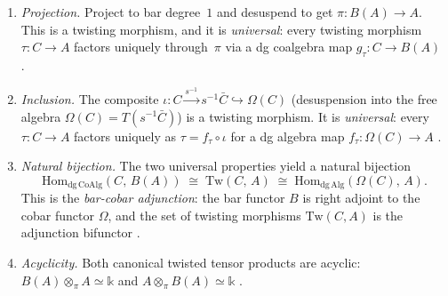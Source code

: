 \begin{proposition}\label{prop:universal-twisting-adjunction}
\begin{enumerate}[label=\textup{(\roman*)}]
\item \emph{Projection.}
 Project to bar degree~$1$ and desuspend to get
 $\pi\colon B(A) \to A$.
 This is a twisting morphism, and it is \emph{universal}:
 every twisting morphism $\tau\colon C \to A$ factors
 uniquely through~$\pi$ via a dg coalgebra map
 $g_\tau\colon C \to B(A)$
 \cite[Theorem~2.2.4]{LV12}.

\item \emph{Inclusion.}
 The composite
 $\iota\colon C \xrightarrow{s^{-1}} s^{-1}\bar{C}
 \hookrightarrow \Omega(C)$
 (desuspension into the free algebra $\Omega(C) = T(s^{-1}\bar{C})$)
 is a twisting morphism. It is \emph{universal}:
 every $\tau\colon C \to A$ factors uniquely as
 $\tau = f_\tau \circ \iota$ for a dg algebra map
 $f_\tau\colon \Omega(C) \to A$
 \cite[Theorem~2.2.7]{LV12}.

\item \emph{Natural bijection.}
 The two universal properties yield a natural bijection
 \begin{equation}\label{eq:tw-adjunction}
 \mathrm{Hom}_{\mathrm{dg\,CoAlg}}(C,\, B(A))
 \;\cong\;
 \mathrm{Tw}(C,\, A)
 \;\cong\;
 \mathrm{Hom}_{\mathrm{dg\,Alg}}(\Omega(C),\, A).
 \end{equation}
 This is the \emph{bar-cobar adjunction}: the bar functor $B$ is
 right adjoint to the cobar functor $\Omega$, and the set of
 twisting morphisms $\mathrm{Tw}(C, A)$ is the adjunction
 bifunctor \cite[Theorem~2.2.9]{LV12}.

\item \emph{Acyclicity.}
 Both canonical twisted tensor products are acyclic:
 $B(A) \otimes_\pi A \simeq \mathbb{k}$
 and $A \otimes_\pi B(A) \simeq \mathbb{k}$
 \cite[Corollary~2.2.5]{LV12}.
\end{enumerate}
\end{proposition}

